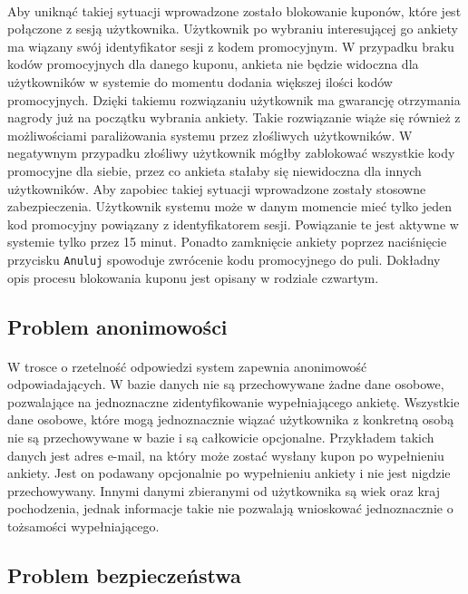 \paragraph{}
Aby uniknąć takiej sytuacji wprowadzone zostało blokowanie kuponów, które jest połączone z sesją użytkownika. Użytkownik po wybraniu interesującej go ankiety ma wiązany swój identyfikator sesji z kodem promocyjnym. W przypadku braku kodów promocyjnych dla danego kuponu, ankieta nie będzie widoczna dla użytkowników w systemie do momentu dodania większej ilości kodów promocyjnych. Dzięki takiemu rozwiązaniu użytkownik ma gwarancję otrzymania nagrody już na początku wybrania ankiety. Takie rozwiązanie wiąże się również z możliwościami paraliżowania systemu przez złośliwych użytkowników. W negatywnym przypadku złośliwy użytkownik mógłby zablokować wszystkie kody promocyjne dla siebie, przez co ankieta stałaby się niewidoczna dla innych użytkowników. Aby zapobiec takiej sytuacji wprowadzone zostały stosowne zabezpieczenia. Użytkownik systemu może w danym momencie mieć tylko jeden kod promocyjny powiązany z identyfikatorem sesji. Powiązanie te jest aktywne w systemie tylko przez 15 minut. Ponadto zamknięcie ankiety poprzez naciśnięcie przycisku \texttt{Anuluj} spowoduje zwrócenie kodu promocyjnego do puli. Dokładny opis procesu blokowania kuponu jest opisany w rodziale czwartym.

\subsection{Problem anonimowości}
\paragraph{}
W trosce o rzetelność odpowiedzi system zapewnia anonimowość odpowiadających. W bazie danych nie są przechowywane żadne dane osobowe, pozwalające na jednoznaczne zidentyfikowanie wypełniającego ankietę. Wszystkie dane osobowe, które mogą jednoznacznie wiązać użytkownika z konkretną osobą nie są przechowywane w bazie i są całkowicie opcjonalne. Przykładem takich danych jest adres e-mail, na który może zostać wysłany kupon po wypełnieniu ankiety. Jest on podawany opcjonalnie po wypełnieniu ankiety i nie jest nigdzie przechowywany. Innymi danymi zbieranymi od użytkownika są wiek oraz kraj pochodzenia, jednak informacje takie nie pozwalają wnioskować jednoznacznie o tożsamości wypełniającego.

\subsection{Problem bezpieczeństwa}
